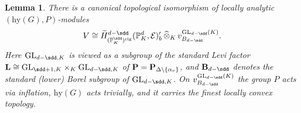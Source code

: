 \documentclass[a4paper, reqno, 10pt]{amsart}
\newtheorem{lemma}[theorem]{Lemma}
\theoremstyle{definition}
\numberwithin{equation}{section}
\newcommand{\cotimes}[1]{{\,\widehat{\otimes}_{#1}\,}}
\newcommand{\GL}{{\mathrm{GL}}}
\newcommand{\hy}{{\mathrm{hy}}}
\newcommand{\rig}{{\mathrm{rig}}}
\newcommand{\BP}{{\mathbb {P}}}
\newcommand{\CE}{{\mathcal {E}}}
\newcommand{\bB}{{\mathrm{\bf B}}}
\newcommand{\bL}{{\mathrm{\bf L}}}
\newcommand{\bP}{{\mathrm{\bf P}}}
\begin{document}
\begin{lemma}\label{Lemma 3 - Dual of limit of local cohomology of Schubert varieties}
	There is a canonical topological isomorphism of locally analytic $(\hy(G),P)$-modules
	\begin{equation*}
		V \cong \widetilde{H}^{d-\sdd}_{(\BP_K^{\sdd})^\rig} (\BP_K^d, \CE)'_b \cotimes{K} v^{\GL_{d-\sdd}(K)}_{B_{d-\sdd}} .
	\end{equation*}
	Here $\GL_{d-\sdd,K}$ is viewed as a subgroup of the standard Levi factor $\bL \cong \GL_{\sdd+1,K}\times_K \GL_{d-\sdd,K}$ of $\bP=\bP_{\Delta\setminus\{\alpha_r\}}$, and $\bB_{d-\sdd}$ denotes the standard (lower) Borel subgroup of $\GL_{d-\sdd,K}$.
	On $v^{\GL_{d-\sdd}(K)}_{B_{d-\sdd}}$ the group $P$ acts via inflation, $\hy(G)$ acts trivially, and it carries the finest locally convex topology.
\end{lemma}
\end{document}
